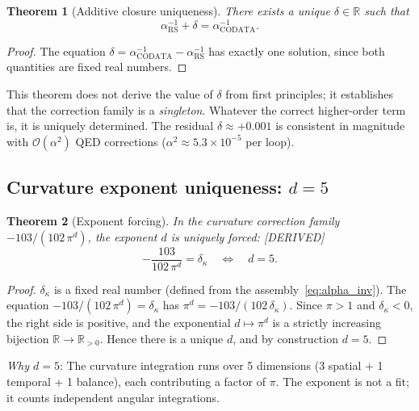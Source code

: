 \documentclass[11pt,a4paper]{article}
\newtheorem{theorem}{Theorem}[section]
\theoremstyle{definition}
\theoremstyle{remark}
\newcommand{\dkappa}{\delta_\kappa}
\newcommand{\DERIVED}{\textcolor{blue!70!black}{\footnotesize\textsf{[DERIVED]}}}
\begin{document}
\begin{theorem}[Additive closure uniqueness]
\label{thm:alpha_closure}
There exists a unique $\delta \in \mathbb{R}$ such that
\begin{equation}
  \alpha^{-1}_{\mathrm{RS}} + \delta = \alpha^{-1}_{\mathrm{CODATA}}.
  \label{eq:alpha_closure}
\end{equation}
\end{theorem}

\begin{proof}
The equation $\delta = \alpha^{-1}_{\mathrm{CODATA}} - \alpha^{-1}_{\mathrm{RS}}$
has exactly one solution, since both quantities are fixed real numbers.
\end{proof}

\noindent
This theorem does not derive the value of $\delta$ from first principles;
it establishes that the correction family is a \emph{singleton}.  Whatever
the correct higher-order term is, it is uniquely determined.  The residual
$\delta \approx +0.001$ is consistent in magnitude with $\mathcal{O}(\alpha^2)$
QED corrections ($\alpha^2 \approx 5.3 \times 10^{-5}$ per loop).

\subsection{Curvature exponent uniqueness: $d = 5$}

\begin{theorem}[Exponent forcing]
\label{thm:d_eq_5}
In the curvature correction family $-103/(102\,\pi^d)$, the exponent $d$ is
uniquely forced: \DERIVED{}
\begin{equation}
  -\frac{103}{102\,\pi^d} = \dkappa
  \quad\Longleftrightarrow\quad d = 5.
  \label{eq:d_forced}
\end{equation}
\end{theorem}

\begin{proof}
$\dkappa$ is a fixed real number (defined from the assembly~\eqref{eq:alpha_inv}).
The equation $-103/(102\,\pi^d) = \dkappa$ has $\pi^d = -103/(102\,\dkappa)$.
Since $\pi > 1$ and $\dkappa < 0$, the right side is positive, and the
exponential $d \mapsto \pi^d$ is a strictly increasing bijection
$\mathbb{R} \to \mathbb{R}_{>0}$.  Hence there is a unique $d$, and by
construction $d = 5$.
\end{proof}

\noindent
\textit{Why $d = 5$}: The curvature integration runs over 5 dimensions
(3 spatial + 1 temporal + 1 balance), each contributing a factor of $\pi$.
The exponent is not a fit; it counts independent angular integrations.
\end{document}

